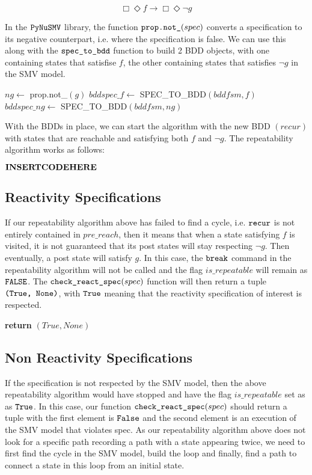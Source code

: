 \documentclass{article}
\begin{document}
\[ \Box\Diamond f \rightarrow \Box\Diamond \neg g\]

In the $\verb|PyNuSMV|$ library, the function $\verb|prop.not_|(spec)$ converts a specification to its negative counterpart, i.e. where the specification is false. We can use this along with the $\verb|spec_to_bdd|$ function to build 2 BDD objects, with one containing states that satisfise $f$, the other containing states that satisfies $\neg g$ in the SMV model.

\begin{algorithmic}[1]
\State $ng \leftarrow$ prop.not\_$(g)$
\State $bddspec\_f \leftarrow$ SPEC\_TO\_BDD$(bddfsm, f)$
\State $bddspec\_ng \leftarrow$ SPEC\_TO\_BDD$(bddfsm, ng)$
\end{algorithmic}

With the BDDs in place, we can start the algorithm with the new BDD $(recur)$ with states that are reachable and satisfying both $f$ and $\neg g$. The repeatability algorithm works as follows:

$\bf{INSERT CODE HERE}$

\subsection{Reactivity Specifications}

If our repeatability algorithm above has failed to find a cycle, i.e. $\verb|recur|$ is not entirely contained in $pre\_reach$, then it means that when a state satisfying $f$ is visited, it is not guaranteed that its post states will stay respecting $\neg g$. Then eventually, a post state will satisfy $g$. In this case, the $\verb|break|$ command in the repeatability algorithm will not be called and the flag $is\_repeatable$ will remain as $\verb|FALSE|$. The $\verb|check_react_spec|(spec)$ function will then return a tuple $\verb|(True, None)|$, with $\verb|True|$ meaning that the reactivity specification of interest is respected.

\begin{algorithmic}[1]
    \State \textbf{return }$(True, None)$
\EndIf
\end{algorithmic}

\subsection{Non Reactivity Specifications}

If the specification is not respected by the SMV model, then the above repeatability algorithm would have stopped and have the flag $is\_repeatable$ set as as $\verb|True|$. In this case, our function $\verb|check_react_spec|(spec)$ should return a tuple with the first element is $\verb|False|$ and the second element is an execution of the SMV model that violates spec. As our repeatability algorithm above does not look for a specific path recording a path with a state appearing twice, we need to first find the cycle in the SMV model, build the loop and finally, find a path to connect a state in this loop from an initial state.
\end{document}
